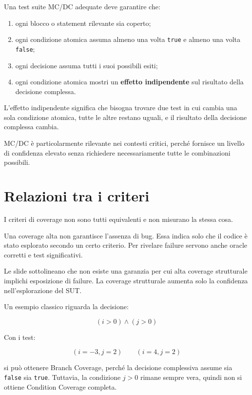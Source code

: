 Una test suite MC/DC adequate deve garantire che:

\begin{enumerate}
    \item ogni blocco o statement rilevante sia coperto;
    \item ogni condizione atomica assuma almeno una volta \texttt{true} e almeno una volta \texttt{false};
    \item ogni decisione assuma tutti i suoi possibili esiti;
    \item ogni condizione atomica mostri un \textbf{effetto indipendente} sul risultato della decisione complessa.
\end{enumerate}

\begin{notaesame}
L'effetto indipendente significa che bisogna trovare due test in cui cambia una sola condizione atomica, tutte le altre restano uguali, e il risultato della decisione complessa cambia.
\end{notaesame}

MC/DC è particolarmente rilevante nei contesti critici, perché fornisce un livello di confidenza elevato senza richiedere necessariamente tutte le combinazioni possibili.

\section{Relazioni tra i criteri}

I criteri di coverage non sono tutti equivalenti e non misurano la stessa cosa.

Una coverage alta non garantisce l'assenza di bug. Essa indica solo che il codice è stato esplorato secondo un certo criterio. Per rivelare failure servono anche oracle corretti e test significativi.

\begin{notaslide}
Le slide sottolineano che non esiste una garanzia per cui alta coverage strutturale implichi esposizione di failure. La coverage strutturale aumenta solo la confidenza nell'esplorazione del SUT.
\end{notaslide}

Un esempio classico riguarda la decisione:

\[
(i > 0) \land (j > 0)
\]

Con i test:

\[
(i=-3, j=2)
\qquad
(i=4, j=2)
\]

si può ottenere Branch Coverage, perché la decisione complessiva assume sia \texttt{false} sia \texttt{true}. Tuttavia, la condizione \(j > 0\) rimane sempre vera, quindi non si ottiene Condition Coverage completa.

